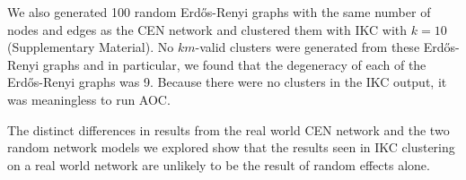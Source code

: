 \documentclass[12pt, oneside]{article}   	%
\begin{document}
We also generated 100 random Erd\H{o}s-Renyi graphs with the same number of nodes and edges as the CEN network and clustered them with IKC with $k=10$ (Supplementary Material). No $km$-valid clusters were generated from these Erd\H{o}s-Renyi graphs and in particular, we found that the degeneracy of each of the Erd\H{o}s-Renyi graphs was 9. Because there were no clusters in the IKC output,  it was meaningless to run AOC.

	
The distinct differences in results from the real world CEN network and the two random network models we explored show that the results seen in IKC clustering on a real world network are unlikely to be the result of random effects alone. 
	
	
	
\end{document}
